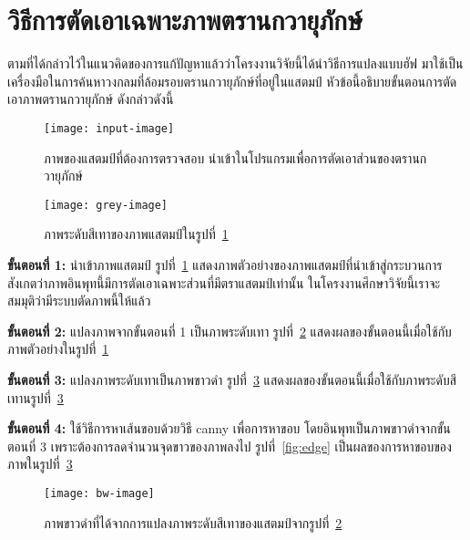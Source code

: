 \section{วิธีการตัดเอาเฉพาะภาพตรานกวายุภักษ์}
\label{sec:bird-cut-method}
ตามที่ได้กล่าวไว้ในแนวคิดของการแก้ปัญหาแล้วว่าโครงงานวิจัยนี้ได้นำวิธีการแปลงแบบฮัฟ มาใช้เป็นเครื่องมือในการค้นหาวงกลมที่ล้อมรอบตรานกวายุภักษ์ที่อยู่ในแสตมป์ หัวข้อนี้อธิบายขั้นตอนการตัดเอาภาพตรานกวายุภักษ์ ดังกล่าวดังนี้

\begin{figure}[!ht]
\centering
\vspace{2em}
\texttt{[image: input-image]}
\vspace{2em}
\caption{ภาพของแสตมป์ที่ต้องการตรวจสอบ นำเข้าในโปรแกรมเพื่อการตัดเอาส่วนของตรานกวายุภักษ์}
\label{fig:input-image}
\end{figure}

\begin{figure}[!ht]
\centering
\vspace{2em}
\texttt{[image: grey-image]}
\vspace{2em}
\caption{ภาพระดับสีเทาของภาพแสตมป์ในรูปที่~\ref{fig:input-image}}
\label{fig:grey}
\end{figure}


\textbf{ขั้นตอนที่ 1:} นำเข้าภาพแสตมป์ รูปที่~\ref{fig:input-image} แสดงภาพตัวอย่างของภาพแสตมป์ที่นำเข้าสู่กระบวนการ สังเกตว่าภาพอินพุทนี้มีการตัดเอาเฉพาะส่วนที่มีตราแสตมป์เท่านั้น ในโครงงานศึกษาวิจัยนี้เราจะสมมุติว่ามีระบบตัดภาพนี้ให้แล้ว

\textbf{ขั้นตอนที่ 2:} แปลงภาพจากขั้นตอนที่ 1 เป็นภาพระดับเทา รูปที่~\ref{fig:grey} แสดงผลของขั้นตอนนี้เมื่อใช้กับภาพตัวอย่างในรูปที่~\ref{fig:input-image}

\textbf{ขั้นตอนที่ 3:} แปลงภาพระดับเทาเป็นภาพขาวดำ รูปที่~\ref{fig:bw} แสดงผลของขั้นตอนนี้เมื่อใช้กับภาพระดับสีเทานรูปที่~\ref{fig:bw}

\textbf{ขั้นตอนที่ 4:} ใช้วิธีการหาเส้นขอบด้วยวิธี canny เพื่อการหาขอบ  โดยอินพุทเป็นภาพขาวดำจากขั้นตอนที่ 3 เพราะต้องการลดจำนวนจุดขาวของภาพลงไป รูปที่~\ref{fig:edge} เป็นผลของการหาขอบของภาพในรูปที่~\ref{fig:bw} 

\begin{figure}[!]
\centering
\vspace{2em}
\texttt{[image: bw-image]}
\vspace{2em}
\caption{ภาพขาวดำที่ได้จากการแปลงภาพระดับสีเทาของแสตมป์จากรูปที่~\ref{fig:grey}}
\label{fig:bw}
\end{figure}


